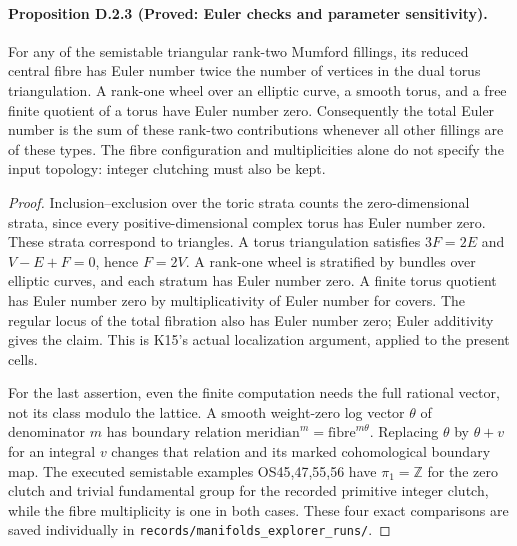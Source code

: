 \paragraph{Proposition D.2.3 (Proved: Euler checks and parameter sensitivity).}
For any of the semistable triangular rank-two Mumford fillings, its
reduced central fibre has Euler number twice the number of vertices
in the dual torus triangulation. A rank-one wheel over an elliptic
curve, a smooth torus, and a free finite quotient of a torus have
Euler number zero. Consequently the total Euler number is the sum
of these rank-two contributions whenever all other fillings are of
these types. The fibre configuration and multiplicities alone do
not specify the input topology: integer clutching must also be kept.
\begin{proof}
Inclusion--exclusion over the toric strata counts the zero-dimensional
strata, since every positive-dimensional complex torus has Euler
number zero. These strata correspond to triangles. A torus
triangulation satisfies $3F=2E$ and $V-E+F=0$, hence $F=2V$.
A rank-one wheel is stratified by bundles over elliptic curves, and
each stratum has Euler number zero. A finite torus quotient has Euler
number zero by multiplicativity of Euler number for covers.
The regular locus of the total fibration also has Euler number zero;
Euler additivity gives the claim. This is K15's actual localization
argument, applied to the present cells.

For the last assertion, even the finite computation needs the
full rational vector, not its class modulo the lattice. A smooth
weight-zero log vector $\theta$ of denominator $m$ has boundary
relation $\mathrm{meridian}^{m}=\mathrm{fibre}^{m\theta}$.
Replacing $\theta$ by $\theta+v$ for an integral $v$ changes that
relation and its marked cohomological boundary map. The executed
semistable examples OS45,47,55,56 have $\pi_1=\mathbb Z$ for the
zero clutch and trivial fundamental group for the recorded primitive
integer clutch, while the fibre multiplicity is one in both cases.
These four exact comparisons are saved individually in
\texttt{records/manifolds\_explorer\_runs/}.
\end{proof}

